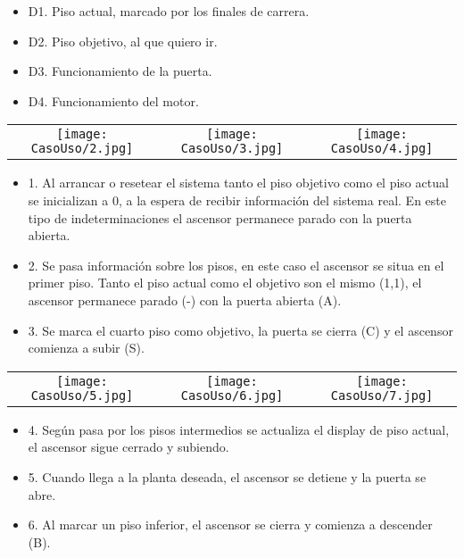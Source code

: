     \begin{itemize}
		    \item  D1. Piso actual, marcado por los finales de carrera.
		    \item  D2. Piso objetivo, al que quiero ir.
		    \item  D3. Funcionamiento de la puerta.
		    \item  D4. Funcionamiento del motor.
	\end{itemize} 
	
    
	\begin{table}[H]
	\centering
	\begin{tabular}{ccc}
		 \texttt{[image: CasoUso/2.jpg]}  & 
		 \texttt{[image: CasoUso/3.jpg]} & 
		 \texttt{[image: CasoUso/4.jpg]}   \\
	\end{tabular}
	\end{table}
	
	\begin{itemize}
	    \item 1. Al arrancar o resetear el sistema tanto el piso objetivo como el piso actual se inicializan a 0, a la espera de recibir información del sistema real. En este tipo de indeterminaciones el ascensor permanece parado con la puerta abierta.	
	    \item 2. Se pasa información sobre los pisos, en este caso el ascensor se situa en el primer piso. Tanto el piso actual como el objetivo son el mismo (1,1), el ascensor permanece parado (-) con la puerta abierta (A).	
	    \item 3. Se marca el cuarto piso como objetivo, la puerta se cierra (C) y el ascensor comienza a subir (S).
	\end{itemize}
	
	\begin{table}[H]
	\centering
	\begin{tabular}{ccc}
		  \texttt{[image: CasoUso/5.jpg]} &
		 \texttt{[image: CasoUso/6.jpg]}  &
		  \texttt{[image: CasoUso/7.jpg]}   \\
	\end{tabular}
	\end{table}
	
	\begin{itemize}
	    \item 4. Según pasa por los pisos intermedios se actualiza el display de piso actual, el ascensor sigue cerrado y subiendo.	
	    \item 5.  Cuando llega a la planta deseada, el ascensor se detiene y la puerta se abre.	
	    \item 6.  Al marcar un piso inferior, el ascensor se cierra y comienza a descender (B).	
	\end{itemize}
	
